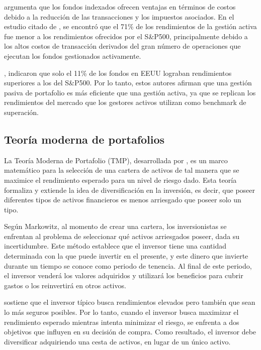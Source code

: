 \documentclass[a4paper,fleqn]{cas-sc}
\begin{document}
\cite{Malkiel1973} argumenta que los fondos indexados ofrecen ventajas en términos de costos debido a la reducción de las transacciones y los impuestos asociados. En el estudio citado de \cite{Malkiel2013}, se encontró que el 71\% de los rendimientos de la gestión activa fue menor a los rendimientos ofrecidos por el S\&P500, principalmente debido a los altos costos de transacción derivados del gran número de operaciones que ejecutan los fondos gestionados activamente.

\cite{Sorensen}, indicaron que solo el 11\% de los fondos en EEUU lograban rendimientos superiores a los del S\&P500. Por lo tanto, estos autores afirman que una gestión pasiva de portafolio es más eficiente que una gestión activa, ya que se replican los rendimientos del mercado que los gestores activos utilizan como benchmark de superación.

\subsection{Teoría moderna de portafolios}

La Teoría Moderna de Portafolio (TMP), desarrollada por \cite{Markowitz1952}, es un marco matemático para la selección de una cartera de activos de tal manera que se maximice el rendimiento esperado para un nivel de riesgo dado. Esta teoría formaliza y extiende la idea de diversificación en la inversión, es decir, que poseer diferentes tipos de activos financieros es menos arriesgado que poseer solo un tipo.

Según Markowitz, al momento de crear una cartera, los inversionistas se enfrentan al problema de seleccionar qué activos arriesgados poseer, dada su incertidumbre. Este método establece que el inversor tiene una cantidad determinada con la que puede invertir en el presente, y este dinero que invierte durante un tiempo se conoce como periodo de tenencia. Al final de este periodo, el inversor venderá los valores adquiridos y utilizará los beneficios para cubrir gastos o los reinvertirá en otros activos.

\cite{Markowitz1952} sostiene que el inversor típico busca rendimientos elevados pero también que sean lo más seguros posibles. Por lo tanto, cuando el inversor busca maximizar el rendimiento esperado mientras intenta minimizar el riesgo, se enfrenta a dos objetivos que influyen en su decisión de compra. Como resultado, el inversor debe diversificar adquiriendo una cesta de activos, en lugar de un único activo.
\end{document}
